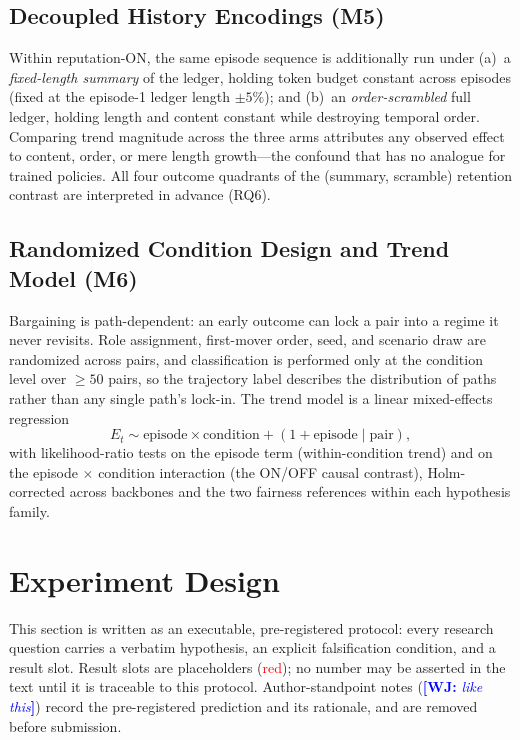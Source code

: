 \documentclass[conference]{IEEEtran}
\newcommand{\wj}[1]{\textcolor{blue}{\textbf{[WJ:} \textit{#1}\textbf{]}}}
\newcommand{\Et}{E_t}
\begin{document}
\subsection{Decoupled History Encodings (M5)}\label{sec:encodings}
Within reputation-ON, the same episode sequence is additionally run under
(a)~a \emph{fixed-length summary} of the ledger, holding token budget constant
across episodes (fixed at the episode-1 ledger length $\pm 5\%$); and
(b)~an \emph{order-scrambled} full ledger, holding length and content constant
while destroying temporal order. Comparing trend magnitude across the three
arms attributes any observed effect to content, order, or mere length
growth---the confound that has no analogue for trained policies. All four
outcome quadrants of the (summary, scramble) retention contrast are
interpreted in advance (RQ6).

\subsection{Randomized Condition Design and Trend Model (M6)}
Bargaining is path-dependent: an early outcome can lock a pair into a regime
it never revisits. Role assignment, first-mover order, seed, and scenario draw
are randomized across pairs, and classification is performed only at the
condition level over $\geq 50$ pairs, so the trajectory label describes the
distribution of paths rather than any single path's lock-in. The trend model
is a linear mixed-effects regression
\begin{equation}
\Et \sim \text{episode} \times \text{condition} + (1 + \text{episode} \mid
\text{pair}),
\label{eq:lme}
\end{equation}
with likelihood-ratio tests on the episode term (within-condition trend) and
on the episode $\times$ condition interaction (the ON/OFF causal contrast),
Holm-corrected across backbones and the two fairness references within each
hypothesis family.
\section{Experiment Design}\label{sec:experiments}

This section is written as an executable, pre-registered protocol: every
research question carries a verbatim hypothesis, an explicit falsification
condition, and a result slot. Result slots are placeholders
(\textcolor{red}{red}); no number may be asserted in the text until it is
traceable to this protocol. Author-standpoint notes (\wj{like this}) record
the pre-registered prediction and its rationale, and are removed before
submission.
\end{document}
